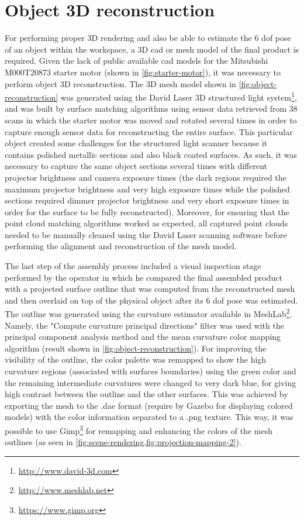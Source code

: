 \section{Object 3D reconstruction}\label{sec:object-reconstruction}

For performing proper 3D rendering and also be able to estimate the 6 \gls{dof} pose of an object within the workspace, a 3D \gls{cad} or mesh model of the final product is required. Given the lack of public available \gls{cad} models for the Mitsubishi M000T20873 starter motor (shown in \cref{fig:starter-motor}), it was necessary to perform object 3D reconstruction. The 3D mesh model shown in \cref{fig:object-reconstruction} was generated using the David Laser 3D structured light system\footnote{\url{http://www.david-3d.com}}, and was built by surface matching algorithms using sensor data retrieved from 38 scans in which the starter motor was moved and rotated several times in order to capture enough sensor data for reconstructing the entire surface. This particular object created some challenges for the structured light scanner because it contains polished metallic sections and also black coated surfaces. As such, it was necessary to capture the same object sections several times with different projector brightness and camera exposure times (the dark regions required the maximum projector brightness and very high exposure times while the polished sections required dimmer projector brightness and very short exposure times in order for the surface to be fully reconstructed). Moreover, for ensuring that the point cloud matching algorithms worked as expected, all captured point clouds needed to be manually cleaned using the David Laser scanning software before performing the alignment and reconstruction of the mesh model.

The last step of the assembly process included a visual inspection stage performed by the operator in which he compared the final assembled product with a projected surface outline that was computed from the reconstructed mesh and then overlaid on top of the physical object after its 6 \gls{dof} pose was estimated. The outline was generated using the curvature estimator available in MeshLab\footnote{\url{http://www.meshlab.net}}. Namely, the "Compute curvature principal directions" filter was used with the principal component analysis method and the mean curvature color mapping algorithm (result shown in \cref{fig:object-reconstruction}). For improving the visibility of the outline, the color palette was remapped to show the high curvature regions (associated with surfaces boundaries) using the green color and the remaining intermediate curvatures were changed to very dark blue, for giving high contrast between the outline and the other surfaces. This was achieved by exporting the mesh to the .dae format (require by Gazebo for displaying colored models) with the color information separated to a .png texture. This way, it was possible to use Gimp\footnote{\url{https://www.gimp.org}} for remapping and enhancing the colors of the mesh outlines (as seen in \cref{fig:scene-rendering,fig:projection-mapping-2}).

